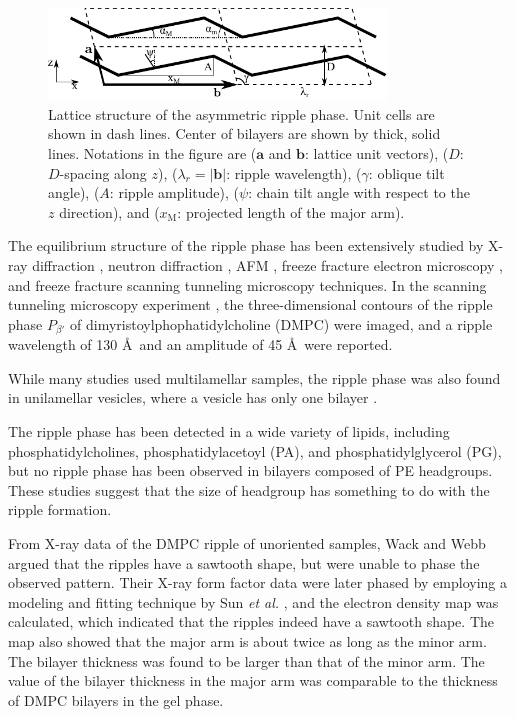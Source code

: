 \begin{figure}[htbp]
  \centering
  \includegraphics[width=0.8\textwidth]{figures/ripple/unit_cell}
  \caption{Lattice structure of the asymmetric ripple phase. Unit cells are shown in
  dash lines. Center of bilayers are shown by thick, solid lines. Notations 
  in the figure are ($\mathbf{a}$ and $\mathbf{b}$: lattice unit vectors),
  ($D$: $D$-spacing along $z$), ($\lambda_r=|\mathbf{b}|$: ripple wavelength), 
  ($\gamma$: oblique tilt angle), ($A$: ripple amplitude),
  ($\psi$: chain tilt angle with respect to the $z$ direction),
  and ($x_\textrm{M}$: projected length of the major arm).}
  \label{fig:unit_cell}
\end{figure}

The equilibrium structure of the ripple phase has been extensively studied by
X-ray diffraction \cite{ref:Janiak76,ref:Janiak79,ref:Tardieu73,ref:Wack89,ref:Yao91,ref:Sun96,ref:Cunningham98},
neutron diffraction \cite{ref:Mortensen88,ref:Bradshaw89}, 
AFM \cite{}, freeze fracture electron microscopy \cite{ref:Woodward96},
and freeze fracture scanning tunneling microscopy \cite{} techniques.
In the scanning tunneling microscopy experiment \cite{ref:Zasadzinski88}, 
the three-dimensional contours of the ripple phase $P_{\beta'}$ of
dimyristoylphophatidylcholine (DMPC) were imaged, and
a ripple wavelength of 130 \AA\ and an amplitude of 45 \AA\ were reported.

While many studies used multilamellar samples, the ripple phase was also found in
unilamellar vesicles, where a vesicle has only one bilayer 
\cite{ref:Mason99}.

The ripple phase has been detected in a wide variety of lipids, including
phosphatidylcholines, phosphatidylacetoyl (PA), and phosphatidylglycerol (PG),
but no ripple phase has been observed in bilayers composed of PE headgroups.
These studies suggest that the size of headgroup has something to do with
the ripple formation.

From X-ray data of the DMPC ripple of unoriented samples, 
Wack and Webb \cite{ref:Wack89} argued that the ripples have a sawtooth shape,
but were unable to phase the observed pattern.
Their X-ray form factor data were later
phased by employing a modeling and fitting technique by Sun \textit{et al.}
\cite{ref:Sun96}, and the electron density map was calculated, which indicated that  
the ripples indeed have a sawtooth shape. The map also showed that
the major arm is about twice as long as the minor arm. The bilayer
thickness was found to be larger than that of the minor arm. The
value of the bilayer thickness in the major arm was comparable to the
thickness of DMPC bilayers in the gel phase.

